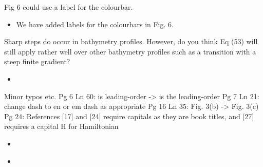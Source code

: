 \documentclass[11pt]{article}
\newcommand{\comment}[1]{{\color{blue} #1}}
\begin{document}
\noindent
\comment{Fig 6 could use a label for the colourbar.}

\begin{itemize}
\item We have added  labels for the colourbars in Fig. 6.
\end{itemize}

\noindent
\comment{Sharp steps do occur in bathymetry profiles. However, do you think Eq (53) will still apply rather well over other bathymetry profiles such as a transition with a steep finite gradient?}

\begin{itemize}
\item
\end{itemize}

\noindent
\comment{Minor typos etc.
Pg 6 Ln 60: is leading-order -> is the leading-order
Pg 7 Ln 21: change dash to en or em dash as appropriate
Pg 16 Ln 35: Fig. 3(b) -> Fig. 3(c)
Pg 24: References [17] and [24] require capitals as they are book titles, and [27] requires a capital H for Hamiltonian}

\begin{itemize}
\item
\end{itemize}

\noindent
\comment{}

\begin{itemize}
\item
\end{itemize}
\end{document}
